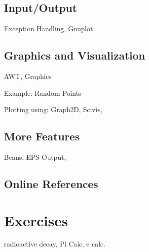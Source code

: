 \subsection{Input/Output}
\label{sec:Input/Output}
Exception Handling, Gnuplot

\subsection{Graphics and Visualization}
\label{sec:Graphics_and_Visualization}
AWT, Graphics

Example: Random Points

Plotting using: Graph2D, Scivis,


\subsection{More Features}
\label{sec:features}
Beans, EPS Output,

\subsection{Online References}
\label{sec:Online_Refernces}


\section{Exercises}
radioactive decay, Pi Calc, e calc.


